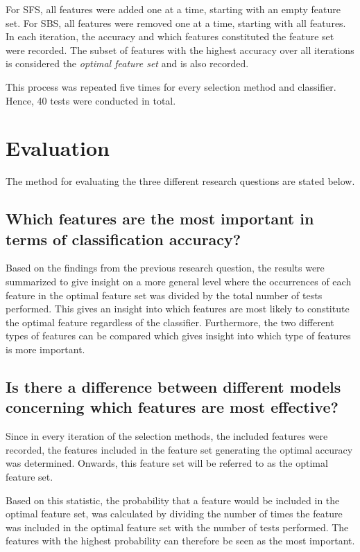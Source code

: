 \documentclass{kththesis}
\begin{document}
For SFS, all features were added one at a time, starting with an empty feature set. For SBS, all features were removed one at a time, starting with all features. In each iteration, the accuracy and which features constituted the feature set were recorded. The subset of features with the highest accuracy over all iterations is considered the \emph{optimal feature set} and is also recorded.

This process was repeated five times for every selection method and classifier. Hence, 40 tests were conducted in total.


\section{Evaluation}

The method for evaluating the three different research questions are stated below.

\subsection{Which features are the most important in terms of classification accuracy?}
Based on the findings from the previous research question, the results were summarized to give insight on a more general level where the occurrences of each feature in the optimal feature set was divided by the total number of tests performed. This gives an insight into which features are most likely to constitute the optimal feature regardless of the classifier. Furthermore, the two different types of features can be compared which gives insight into which type of features is more important.

\subsection{Is there a difference between different models concerning which features are most effective?}
Since in every iteration of the selection methods, the included features were recorded, the features included in the feature set generating the optimal accuracy was determined. Onwards, this feature set will be referred to as the optimal feature set. 

Based on this statistic, the probability that a feature would be included in the optimal feature set, was calculated by dividing the number of times the feature was included in the optimal feature set with the number of tests performed. The features with the highest probability can therefore be seen as the most important.
\end{document}

